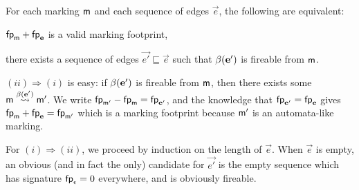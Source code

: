 \begin{lemmaE}[][category=proofs] %
  \label{lem:fireable-subsequence}
  For each marking $\mathsf{m}$ and each sequence of edges
  $\vec{e}$, the following are equivalent: \begin{compactenum}[(i)]
  \item $\mathsf{fp}_{\mathsf{m}} + \mathsf{fp}_{\mathbf{e}}$ is a valid marking footprint,
  \item there exists a sequence of edges $\vec{e'} \sqsubseteq
    \vec{e}$ such that $\beta(\mathbf{e'})$ is fireable from $\mathsf{m}$.
  \end{compactenum}
\end{lemmaE}
\begin{proofE}
  $(ii) \Rightarrow (i)$ is easy: if $\beta(\mathbf{e'})$ is fireable from $\mathsf{m}$,
  then there exists some $\mathsf{m} \stackrel{\beta(\mathbf{e'})}{\leadsto} \mathsf{m}'$.
  We write $\mathsf{fp}_{\mathsf{m}'} - \mathsf{fp}_{\mathsf{m}} = \mathsf{fp}_{\mathbf{e'}}$,
  and the knowledge that $\mathsf{fp}_{\mathbf{e'}} = \mathsf{fp}_{\mathbf{e}}$
  gives $\mathsf{fp}_{\mathsf{m}} + \mathsf{fp}_{\mathbf{e}} = \mathsf{fp}_{\mathsf{m}'}$
  which is a marking footprint because $\mathsf{m}'$ is an automata-like marking.

  For $(i) \Rightarrow (ii)$, we proceed by induction on the length of $\vec{e}$.
  When $\vec{e}$ is empty, an obvious (and in fact the only) candidate for $\vec{e'}$
  is the empty sequence which has signature $\mathsf{fp}_{\epsilon} = 0$ everywhere,
  and is obviously fireable.


\end{proofE}
